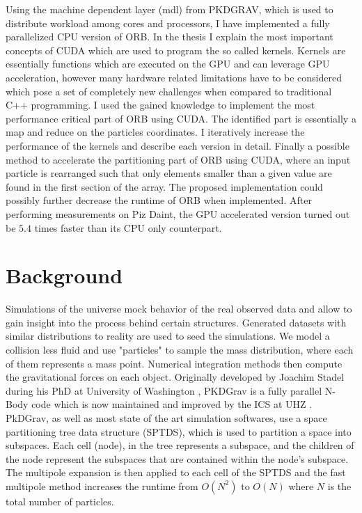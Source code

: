 \documentclass[]{article}
\begin{document}
Using the machine dependent layer (mdl) from PKDGRAV, which is used to distribute workload among cores and processors, I have implemented a fully parallelized CPU version of ORB. In the thesis I explain the most important concepts of CUDA which are used to program the so called kernels. Kernels are essentially functions which are executed on the GPU and can leverage GPU acceleration, however many hardware related limitations have to be considered which pose a set of completely new challenges when compared to traditional C++ programming.
I used the gained knowledge to implement the most performance critical part of ORB using CUDA. The identified part is essentially a map and reduce on the particles coordinates. I iteratively increase the performance of the kernels and describe each version in detail. Finally a possible method to accelerate the partitioning part of ORB using CUDA, where an input particle is rearranged such that only elements smaller than a given value are found in the first section of the array. The proposed implementation could possibly further decrease the runtime of ORB when implemented.
After performing measurements on Piz Daint, the GPU accelerated version turned out be $5.4$ times faster than its CPU only counterpart. 

\newpage
\section{Background}

Simulations of the universe mock behavior of the real observed data and allow to gain insight into the process behind certain structures\cite{Stadel2001}. Generated datasets with similar distributions to reality are used to seed the simulations. We model a collision less fluid and use "particles" to sample the mass distribution, where each of them represents a mass point. Numerical integration methods then compute the gravitational forces on each object.
Originally developed by Joachim Stadel during his PhD at University of Washington \cite{Stadel2001}, PKDGrav is a fully parallel N-Body code which is now maintained and improved by the ICS at UHZ \cite{ICS}. 
PkDGrav, as well as most state of the art simulation softwares, use a space partitioning tree data structure (SPTDS), which is used to partition a space into subspaces. Each cell (node), in the tree represents a subspace, and the children of the node represent the subspaces that are contained within the node's subspace. The multipole expansion is then applied to each cell of the SPTDS and the fast multipole method increases the runtime from $O(N^2)$ to $O(N)$ where $N$ is the total number of particles. \cite{Stadel2001}
\end{document}
